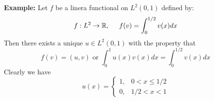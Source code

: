 \textbf{Example: } Let $f$ be a linera functional on $L^2(0,1)$ defined by:
\[
    f: L^2 \to \mathbb{R}, \hspace{0.5cm} f(v) = \int_{0}^{1/2} v(x)dx    
\]
Then there exists a unique $u \in L^2(0,1)$ with the property that
\[
    f(v) = (u,v) \text{ or } \int_0^1 u(x)v(x)dx = \int_{0}^{1/2} v(x)dx    
\]
Clearly we have 
\[
    u(x) = \begin{cases}
        1, & 0 < x \leq 1/2\\
        0, & 1/2 < x < 1
    \end{cases}    
\]